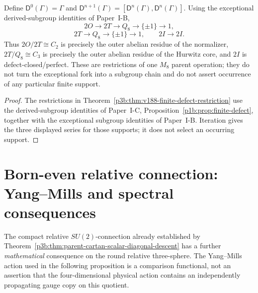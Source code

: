 \documentclass[12pt,a4paper]{article}
\begin{document}
\begin{corollary}
\label{p3b:cor:v188-exceptional-defect-filtration}
Define $\mathsf D^0(\Gamma)=\Gamma$ and
$\mathsf D^{n+1}(\Gamma)=[\mathsf D^n(\Gamma),\mathsf D^n(\Gamma)]$.
Using the exceptional derived-subgroup identities of Paper~I-B,
\[
 \boxed{2O\to2T\to Q_8\to\{\pm1\}\to1,}
\]
\[
 \boxed{2T\to Q_8\to\{\pm1\}\to1,}
\qquad
 \boxed{2I\to2I.}
\]
Thus $2O/2T\cong C_2$ is precisely the outer abelian residue of the
normalizer, $2T/Q_8\cong C_3$ is precisely the outer abelian residue of the
Hurwitz core, and $2I$ is defect-closed/perfect.  These are restrictions of
one $M_8$ parent operation; they do not turn the exceptional fork into a
subgroup chain and do not assert occurrence of any particular finite support.
\end{corollary}

\begin{proof}
The restrictions in Theorem~\ref{p3b:thm:v188-finite-defect-restriction}
use the derived-subgroup identities of Paper~I-C,
Proposition~\ref{p1b:prop:finite-defect}, together with the exceptional subgroup identities of Paper~I-B.  Iteration gives the three displayed series for those supports;
it does not select an occurring support.
\end{proof}


\section{Born-even relative connection: Yang--Mills and spectral consequences}
\label{p3b:sec:v346-born-meron}
The compact relative $SU(2)$-connection already established by
Theorem~\ref{p3b:thm:parent-cartan-scalar-diagonal-descent} has a further
\emph{mathematical} consequence on the round relative three-sphere.  The
Yang--Mills action used in the following proposition is a comparison
functional, not an assertion that the four-dimensional physical action
contains an independently propagating gauge copy on this quotient.
\end{document}
